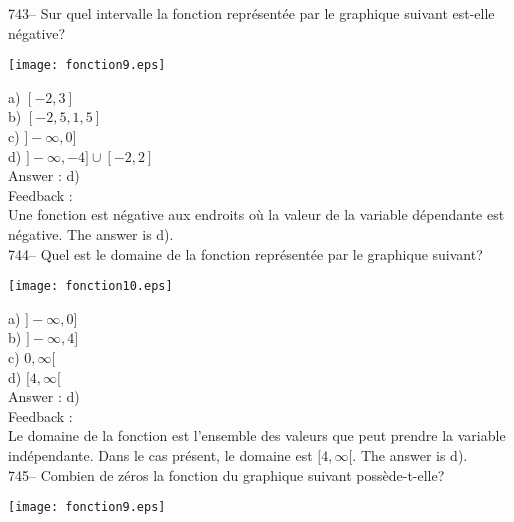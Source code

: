 \documentclass[letterpaper, 12pt]{article}
\begin{document}
743-- Sur quel intervalle la fonction repr\'esent\'ee par le graphique
suivant est-elle n\'egative?\\

    \begin{center}
    \texttt{[image: fonction9.eps]}
    \end{center}

a) $[-2, 3]$\\
b) $[-2,5, 1,5]$\\
c) $]-\infty,0]$\\
d) $]-\infty,-4]\cup[-2,2]$\\

Answer : d)\\

Feedback : \\
Une fonction est n\'egative aux endroits o\`u la valeur de la variable
d\'ependante est n\'egative.  The answer is d).\\

744-- Quel est le domaine de la fonction repr\'esent\'ee par le graphique
suivant?\\

    \begin{center}
    \texttt{[image: fonction10.eps]}
    \end{center}
a) $]-\infty,0]$\\
b) $]-\infty,4]$\\
c) $0,\infty[$\\
d) $[4, \infty[$\\

Answer : d)\\

Feedback : \\
Le domaine de la fonction est l'ensemble des valeurs que peut prendre la
variable ind\'ependante.  Dans le cas pr\'esent, le domaine est $[4,
\infty[$.  The answer is d).\\

745-- Combien de z\'eros la fonction du graphique suivant
poss\`ede-t-elle?\\
    \begin{center}
    \texttt{[image: fonction9.eps]}
    \end{center}
\end{document}
